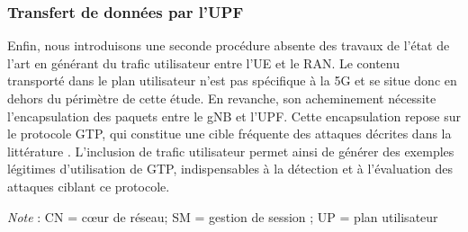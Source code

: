 \documentclass[a4paper,11pt,twoside]{StyleThese}
\begin{document}
\subsubsection{Transfert de données par l’UPF}
Enfin, nous introduisons une seconde procédure absente des travaux de l’état de l’art en générant du trafic utilisateur entre l’UE et le RAN. Le contenu transporté dans le plan utilisateur n’est pas spécifique à la 5G et se situe donc en dehors du périmètre de cette étude. En revanche, son acheminement nécessite l’encapsulation des paquets entre le gNB et l’UPF. Cette encapsulation repose sur le protocole GTP, qui constitue une cible fréquente des attaques décrites dans la littérature \cite{spoof_gtp,pfcp_in_gtp}. L’inclusion de trafic utilisateur permet ainsi de générer des exemples légitimes d’utilisation de GTP, indispensables à la détection et à l’évaluation des attaques ciblant ce protocole.

\begin{table}[ht]
    \centering
    \footnotesize \textit{Note} : CN = cœur de réseau; SM = gestion de session ; UP = plan utilisateur \\
    \caption{Liste des attaques présentes dans le dataset ainsi que leurs caractéristiques.}
    \label{tab:malicious_table}
    \raggedright
\end{table}
\end{document}
